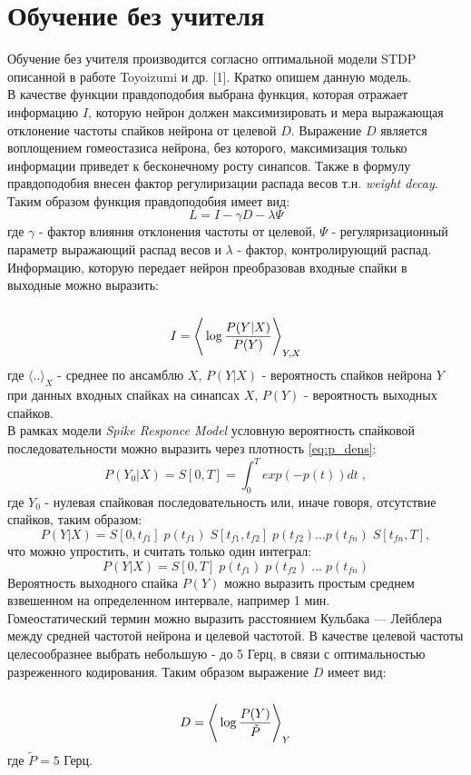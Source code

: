 \documentclass[a4paper,10pt]{article}
\def\la{\left\langle\rule{0pt}{3em}}
\def\ra{\right\rangle}
\begin{document}
\section*{Обучение без учителя}
\indent Обучение без учителя производится согласно оптимальной модели STDP описанной в работе Toyoizumi и др. [1]. Кратко опишем данную модель.\\
\indent В качестве функции правдоподобия выбрана функция, которая отражает информацию $I$, которую нейрон должен максимизировать и мера выражающая отклонение частоты спайков нейрона от целевой $D$. Выражение $D$ является воплощением гомеостазиса нейрона, без которого, максимизация только информации приведет к бесконечному росту синапсов. Также в формулу правдоподобия внесен фактор регулиризации распада весов т.н. \textit{weight decay}.\\
\indent Таким образом функция правдоподобия имеет вид:
\begin{equation}\label{eq:lh}
L=I-\gamma D - \lambda \Psi
\end{equation} 
где $\gamma$ - фактор влияния отклонения частоты от целевой, $\Psi$ - регуляризационный параметр выражающий распад весов и $\lambda$ - фактор, контролирующий распад.\\
\indent Информацию, которую передает нейрон преобразовав входные спайки в выходные можно выразить:
\begin{equation}\label{eq:I}
I = \la\log \frac{P(Y|X)}{P(Y)} \ra_{Y,X}
\end{equation}
где $\langle..\rangle_{X}$ - среднее по ансамблю $X$, $P(Y|X)$ - вероятность спайков нейрона $Y$ при данных входных спайках на синапсах $X$, $P(Y)$ - вероятность выходных спайков.\\
\indent В рамках модели \textit{Spike Responce Model} условную вероятность спайковой последовательности можно выразить через плотность \ref{eq:p_dens}:
\begin{equation}\label{eq:p_y}
P(Y_{0}|X) = S[0,T] = \int_{0}^{T} exp(-p(t))dt\;,
\end{equation}
где $Y_{0}$ - нулевая спайковая последовательность или, иначе говоря, отсутствие спайков, таким образом:
\begin{equation}\label{eq:p_y_complex}
P(Y|X)= S[0,t_{f1}]\; p(t_{f1})\;S[t_{f1},t_{f2}]\;p(t_{f2})...p(t_{fn}) \; S[t_{fn},T],
\end{equation}
что можно упростить, и считать только один интеграл:
\begin{equation}\label{eq:p_y}
P(Y|X)= S[0,T]\; p(t_{f1})\;p(t_{f2})\;...\;p(t_{fn})
\end{equation}
\indent Вероятность выходного спайка $P(Y)$ можно выразить простым среднем взвешенном на определенном интервале, например 1 мин.\\
\indent Гомеостатический термин можно выразить расстоянием Кульбака — Лейблера между средней частотой нейрона и целевой частотой. В качестве целевой частоты целесообразнее выбрать небольшую - до 5 Герц, в связи с оптимальностью разреженного кодирования. Таким образом выражение $D$ имеет вид:
\begin{equation}\label{eq:D}
D=\la \log \frac{P(Y)}{\tilde{P}} \ra_{Y}
\end{equation}
где $\tilde{P} = 5$ Герц.
\end{document}
